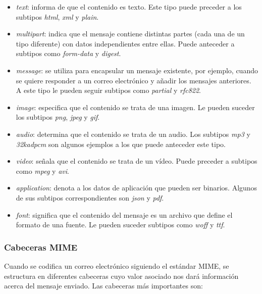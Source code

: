 \begin{itemize}
	\item \textit{text}: informa de que el contenido es texto. Este tipo puede preceder a los subtipos \textit{html}, \textit{xml} y \textit{plain}.
	\item\textit{multipart}: indica que el mensaje contiene distintas partes (cada una de un tipo diferente) con datos independientes entre ellas. Puede anteceder a subtipos como \textit{form-data} y \textit{digest}.
	\item\textit{message}: se utiliza para encapsular un mensaje existente, por ejemplo, cuando se quiere responder a un correo electrónico y añadir los mensajes anteriores. A este tipo le pueden seguir subtipos como \textit{partial} y \textit{rfc822}.
	\item\textit{image}: especifica que el contenido se trata de una imagen. Le pueden suceder los subtipos \textit{png}, \textit{jpeg} y \textit{gif}.
	\item\textit{audio}: determina que el contenido se trata de un audio. Los subtipos \textit{mp3} y \textit{32kadpcm} son algunos ejemplos a los que puede anteceder este tipo.
	\item\textit{video}: señala que el contenido se trata de un vídeo. Puede preceder a subtipos como \textit{mpeg} y \textit{avi}.
	\item\textit{application}: denota a los datos de aplicación que pueden ser binarios. Algunos de sus subtipos correspondientes son \textit{json} y \textit{pdf}.
	\item\textit{font}: significa que el contenido del mensaje es un archivo que define el formato de una fuente. Le pueden suceder subtipos como \textit{woff} y \textit{ttf}.
\end{itemize}

\subsubsection{Cabeceras MIME}
Cuando se codifica un correo electrónico siguiendo el estándar MIME, se estructura en diferentes cabeceras cuyo valor asociado nos dará información acerca del mensaje enviado. Las cabeceras más importantes son:

